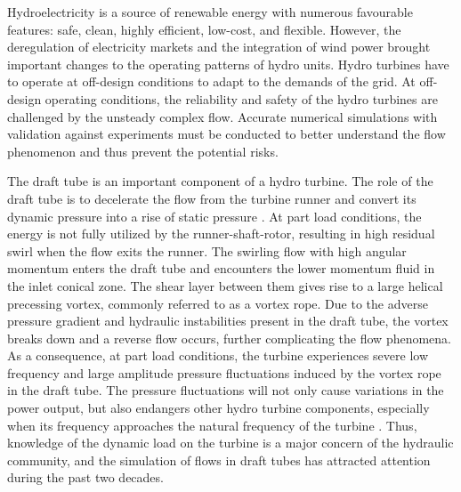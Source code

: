 Hydroelectricity is a source of renewable energy with numerous favourable features: safe, clean, highly efficient, low-cost, and flexible. However, the deregulation of electricity markets and the integration of wind power brought important changes to the operating patterns of hydro units. Hydro turbines have to operate at off-design conditions to adapt to the demands of the grid. At off-design operating conditions, the reliability and safety of the hydro turbines are challenged by the unsteady complex flow. Accurate numerical simulations with validation against experiments must be conducted to better understand the flow phenomenon and thus prevent the potential risks.

The draft tube is an important component of a hydro turbine. The role of the draft tube is to decelerate the flow from the turbine runner and convert its dynamic pressure into a rise of static pressure \cite{sick2002cfd}. At part load conditions, the energy is not fully utilized by the runner-shaft-rotor, resulting in high residual swirl when the flow exits the runner. The swirling flow with high angular momentum enters the draft tube and encounters the lower momentum fluid in the inlet conical zone. The shear layer between them gives rise to a large helical precessing vortex, commonly referred to as a vortex rope. Due to the adverse pressure gradient and hydraulic instabilities present in the draft tube, the vortex breaks down and a reverse flow occurs, further complicating the flow phenomena. As a consequence, at part load conditions, the turbine experiences severe low frequency and large amplitude pressure fluctuations induced by the vortex rope in the draft tube. The pressure fluctuations will not only cause variations in the power output, but also endangers other hydro turbine components, especially when its frequency approaches the natural frequency of the turbine \cite{dorfler2012flow}. Thus, knowledge of the dynamic load on the turbine is a major concern of the hydraulic community, and the simulation of flows in draft tubes has attracted attention during the past two decades.

